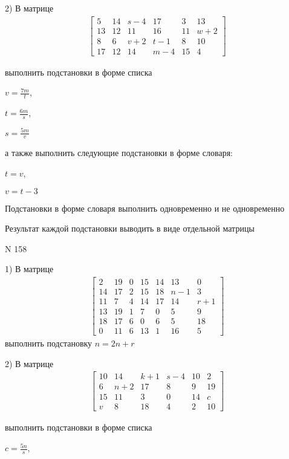 \documentclass[11pt]{report}
\begin{document}
    2) В матрице
\begin{align*}
\left[\begin{matrix}5 & 14 & s - 4 & 17 & 3 & 13\\13 & 12 & 11 & 16 & 11 & w + 2\\8 & 6 & v + 2 & t - 1 & 8 & 10\\17 & 12 & 14 & m - 4 & 15 & 4\end{matrix}\right]
\end{align*}

выполнить подстановки в форме списка

$v=\frac{7 m}{t}$,

$t=\frac{6 m}{s}$,

$s=\frac{5 m}{v}$

а также выполнить следующие подстановки в форме словаря:

$t=v$,

$v=t - 3$


    Подстановки в форме словаря выполнить одновременно и не одновременно


    Результат каждой подстановки выводить в виде отдельной матрицы

\newpage
N 158


    1) В матрице
\begin{align*}
\left[\begin{matrix}2 & 19 & 0 & 15 & 14 & 13 & 0\\14 & 17 & 2 & 15 & 18 & n - 1 & 3\\11 & 7 & 4 & 14 & 17 & 14 & r + 1\\13 & 19 & 1 & 7 & 0 & 5 & 9\\18 & 17 & 6 & 0 & 6 & 5 & 18\\0 & 11 & 6 & 13 & 1 & 16 & 5\end{matrix}\right]
\end{align*}
выполнить подстановку $n=2 n + r$


    2) В матрице
\begin{align*}
\left[\begin{matrix}10 & 14 & k + 1 & s - 4 & 10 & 2\\6 & n + 2 & 17 & 8 & 9 & 19\\15 & 11 & 3 & 0 & 14 & c\\v & 8 & 18 & 4 & 2 & 10\end{matrix}\right]
\end{align*}

выполнить подстановки в форме списка

$c=\frac{5 n}{s}$,
\end{document}
